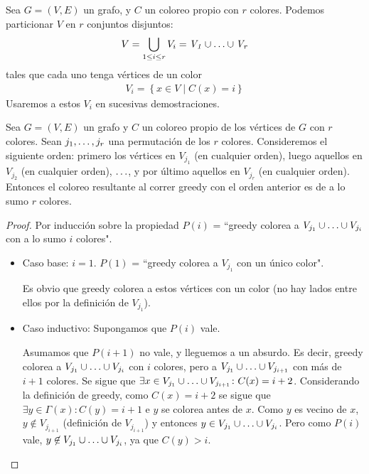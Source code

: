 \begin{definition}
  Sea $G = (V, E)$ un grafo, y  $C$ un coloreo propio con $r$ colores. Podemos particionar $V$ en $r$ conjuntos disjuntos:
  \begin{align}
    V = \bigcup_{1\le i \le r} V_i = \mathit{V_1} \cup \mathellipsis \cup \mathit{V_r}
  \end{align}  
  tales que cada uno tenga vértices de un color
  \begin{align}
    \mathit{V_i} = \left\{x \in V \mid C(x) = i\right\}
  \end{align}
  Usaremos a estos $V_i$ en sucesivas demostraciones.
\end{definition}

\begin{theorem}
  Sea $G = (V, E)$ un grafo y $C$ un coloreo propio de los vértices de $G$ con $r$ colores. Sean $j_1, \mathellipsis, j_r$ una permutación de los $r$ colores. Consideremos el siguiente orden: primero los vértices en $V_{j_1}$ (en cualquier orden), luego aquellos en $V_{j_2}$ (en cualquier orden), $\mathellipsis$, y por último aquellos en $V_{j_r}$ (en cualquier orden). Entonces el coloreo resultante al correr greedy con el orden anterior es de a lo sumo $r$ colores.
\end{theorem}

\begin{proof}
  Por inducción sobre la propiedad $P(i)$ = ``greedy colorea a $V_{j_1} \cup \mathellipsis \cup V_{j_i}$ con a lo sumo $i$ colores".
  \begin{itemize}
  \item Caso base: $i = 1$. $P(1)$ = ``greedy colorea a $V_{j_1}$ con un único color".
    
    Es obvio que greedy colorea a estos vértices con un color (no hay lados entre ellos por la definición de $V_{j_1}$).
    
  \item Caso inductivo: Supongamos que $P(i)$ vale.
    
    Asumamos que $P(i+1)$ no vale, y lleguemos a un absurdo. Es decir, greedy colorea a $V_{j_1} \cup \mathellipsis \cup V_{j_i}$ con $i$ colores, pero a $V_{j_1} \cup \mathellipsis \cup V_{j_{i+1}}$ con más de $i + 1$ colores. Se sigue que $\exists x \in V_{j_1} \cup \mathellipsis \cup V_{j_{i+1}} \colon C(x) = i + 2$. Considerando la definición de greedy, como $C(x) = i + 2$ se sigue que  $\exists y \in \Gamma(x) \colon C(y) = i + 1$ e $y$ se colorea antes de $x$. Como $y$ es vecino de $x$, $y \not\in V_{j_{i+1}}$ (definición de $V_{j_{i+1}}$) y entonces $y \in V_{j_1} \cup \mathellipsis \cup V_{j_i}$. Pero como $P(i)$ vale, $y \not\in V_{j_1} \cup \mathellipsis \cup V_{j_i}$, ya que $C(y) > i$.
  \end{itemize}
\end{proof}

